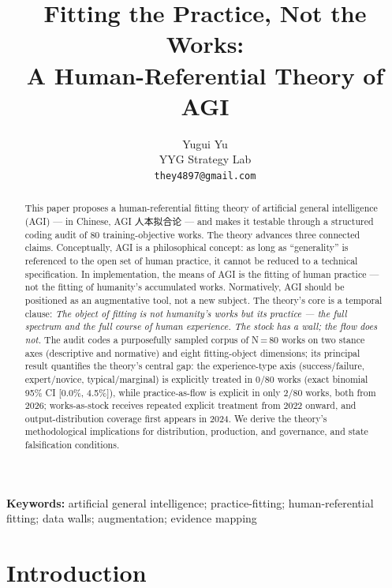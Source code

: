\documentclass[10pt]{article}
\title{\textbf{Fitting the Practice, Not the Works:\\
A Human-Referential Theory of AGI}}
\author{Yugui Yu\\
YYG Strategy Lab\\
\texttt{they4897@gmail.com}
}
\date{}
\begin{document}
\maketitle

\begin{abstract}
\noindent This paper proposes a human-referential fitting theory of artificial general intelligence (AGI) --- in Chinese, AGI 人本拟合论 --- and makes it testable through a structured coding audit of 80 training-objective works. The theory advances three connected claims. Conceptually, AGI is a philosophical concept: as long as ``generality'' is referenced to the open set of human practice, it cannot be reduced to a technical specification. In implementation, the means of AGI is the fitting of human practice --- not the fitting of humanity's accumulated works. Normatively, AGI should be positioned as an augmentative tool, not a new subject. The theory's core is a temporal clause: \emph{The object of fitting is not humanity's works but its practice --- the full spectrum and the full course of human experience. The stock has a wall; the flow does not.} The audit codes a purposefully sampled corpus of N\,=\,80 works on two stance axes (descriptive and normative) and eight fitting-object dimensions; its principal result quantifies the theory's central gap: the experience-type axis (success/failure, expert/novice, typical/marginal) is explicitly treated in 0/80 works (exact binomial 95\% CI [0.0\%, 4.5\%]), while practice-as-flow is explicit in only 2/80 works, both from 2026; works-as-stock receives repeated explicit treatment from 2022 onward, and output-distribution coverage first appears in 2024. We derive the theory's methodological implications for distribution, production, and governance, and state falsification conditions.
\end{abstract}

\medskip
\noindent\textbf{Keywords:} artificial general intelligence; practice-fitting; human-referential fitting; data walls; augmentation; evidence mapping

\section{Introduction}\label{sec:intro}
\end{document}
